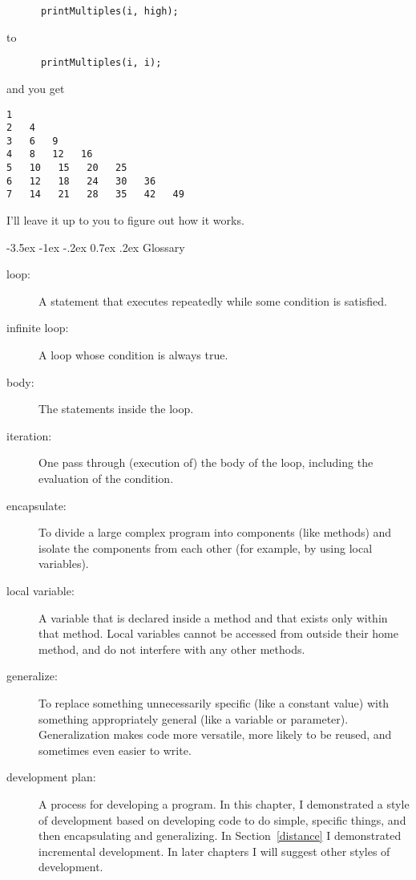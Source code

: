 \documentclass{book}
\makeatletter
\renewcommand{\section}{\@startsection 
    {section} {1} {0mm}%
    {-3.5ex \@plus -1ex \@minus -.2ex}%
    {0.7ex \@plus.2ex}%
    {\normalfont\Large\bfseries}}
\makeatother
\begin{document}
\begin{verbatim}
      printMultiples(i, high);
\end{verbatim}
%
to

\begin{verbatim}
      printMultiples(i, i);
\end{verbatim}
%
and you get

\begin{verbatim}
1   
2   4   
3   6   9   
4   8   12   16   
5   10   15   20   25   
6   12   18   24   30   36   
7   14   21   28   35   42   49  
\end{verbatim}
%
I'll leave it up to you to figure out how it works.


\section{Glossary}

\begin{description}

\item[loop:]  A statement that executes repeatedly while
some condition is satisfied.

\item[infinite loop:]  A loop whose condition is always true.

\item[body:]  The statements inside the loop.

\item[iteration:]  One pass through (execution of) the body
of the loop, including the evaluation of the condition.

\item[encapsulate:]  To divide a large complex program into
components (like methods) and isolate the components from
each other (for example, by using local variables).

\item[local variable:]  A variable that is declared inside
a method and that exists only within that method.  Local variables
cannot be accessed from outside their home method, and do not
interfere with any other methods.

\item[generalize:]  To replace something unnecessarily specific
(like a constant value) with something appropriately general
(like a variable or parameter).  Generalization makes code more
versatile, more likely to be reused, and sometimes even easier
to write.

\item[development plan:] A process for developing a program.  In this
  chapter, I demonstrated a style of development based on developing
  code to do simple, specific things, and then encapsulating and
  generalizing.  In Section~\ref{distance} I demonstrated incremental
  development.  In later chapters I will suggest other styles of
  development.


\end{description}
\end{document}

